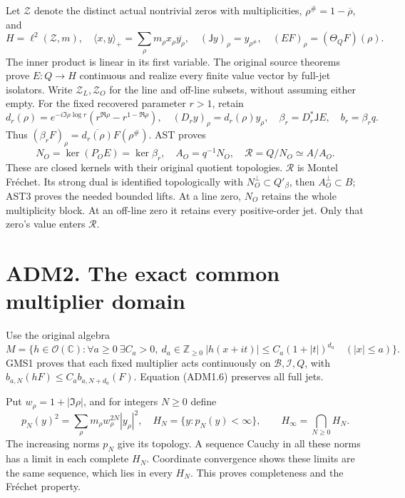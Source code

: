 Let \(\mathscr Z\) denote the distinct actual nontrivial zeros with
multiplicities, \(\rho^\#=1-\overline\rho\), and \[
H=\ell^2(\mathscr Z,m),\quad
\langle x,y\rangle_+=\sum_\rho m_\rho x_\rho\overline{y_\rho},
\quad(\mathsf Jy)_\rho=y_{\rho^\#},\quad
(EF)_\rho=(\Theta_QF)(\rho).
\tag{ADM1.8}
\] The inner product is linear in its first variable. The original
source theorems prove \(E:Q\to H\) continuous and realize every finite
value vector by full-jet isolators. Write \(\mathscr Z_L,\mathscr Z_O\)
for the line and off-line subsets, without assuming either empty. For
the fixed recovered parameter \(r>1\), retain \[
d_r(\rho)=e^{-i\Im\rho\log r}
(r^{\Re\rho}-r^{1-\Re\rho}),\quad
(D_ry)_\rho=d_r(\rho)y_\rho,\quad
\beta_r=D_r^*\mathsf JE,\quad b_r=\beta_rq.
\tag{ADM1.9}
\] Thus \((\beta_rF)_\rho=\overline{d_r(\rho)}F(\rho^\#)\). AST proves
\[
N_O=\ker(P_OE)=\ker\beta_r,\quad A_O=q^{-1}N_O,\quad
\mathcal R=Q/N_O\simeq A/A_O.
\tag{ADM1.10}
\] These are closed kernels with their original quotient topologies.
\(\mathcal R\) is Montel Fréchet. Its strong dual is identified
topologically with \(N_O^\perp\subset Q'_\beta\), then
\(A_O^\perp\subset B\); AST3 proves the needed bounded lifts. At a line
zero, \(N_O\) retains the whole multiplicity block. At an off-line zero
it retains every positive-order jet. Only that zero's value enters
\(\mathcal R\).

\section{ADM2. The exact common multiplier
domain}\label{adm2.-the-exact-common-multiplier-domain}

Use the original algebra \[
M=\{h\in\mathcal O(\mathbb C):
\forall a\ge0\ \exists C_a>0,\ d_a\in\mathbb Z_{\ge0}\
|h(x+it)|\le C_a(1+|t|)^{d_a}\quad(|x|\le a)\}.
\tag{ADM2.1}
\] GMS1 proves that each fixed multiplier acts continuously on
\(\mathcal B,\mathcal I,Q\), with \(b_{a,N}(hF)\le C_a b_{a,N+d_a}(F)\).
Equation (ADM1.6) preserves all full jets.

Put \(w_\rho=1+|\Im\rho|\), and for integers \(N\ge0\) define \[
p_N(y)^2=\sum_\rho m_\rho w_\rho^{2N}|y_\rho|^2,\quad
H_N=\{y:p_N(y)<\infty\},\qquad H_\infty=\bigcap_{N\ge0}H_N.
\tag{ADM2.2}
\] The increasing norms \(p_N\) give its topology. A sequence Cauchy in
all these norms has a limit in each complete \(H_N\). Coordinate
convergence shows these limits are the same sequence, which lies in
every \(H_N\). This proves completeness and the Fréchet property.

